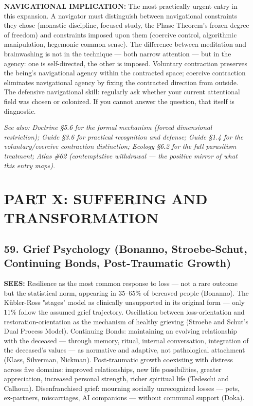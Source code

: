 \textbf{NAVIGATIONAL IMPLICATION:} The most practically urgent entry in this expansion. A navigator must distinguish between navigational constraints they chose (monastic discipline, focused study, the Phase Theorem's frozen degree of freedom) and constraints imposed upon them (coercive control, algorithmic manipulation, hegemonic common sense). The difference between meditation and brainwashing is not in the technique — both narrow attention — but in the agency: one is self-directed, the other is imposed. Voluntary contraction preserves the being's navigational agency within the contracted space; coercive contraction eliminates navigational agency by fixing the contracted direction from outside. The defensive navigational skill: regularly ask whether your current attentional field was chosen or colonized. If you cannot answer the question, that itself is diagnostic.


\textit{See also: Doctrine §5.6 for the formal mechanism (forced dimensional restriction); Guide §3.6 for practical recognition and defense; Guide §1.4 for the voluntary/coercive contraction distinction; Ecology §6.2 for the full parasitism treatment; Atlas \#62 (contemplative withdrawal — the positive mirror of what this entry maps).}


\bigskip\noindent\makebox[\textwidth]{\color{rulegray}\rule{5cm}{0.3pt}}\bigskip


\chapter*{PART X: SUFFERING AND TRANSFORMATION}


\section*{59. Grief Psychology (Bonanno, Stroebe-Schut, Continuing Bonds, Post-Traumatic Growth)}


\textbf{SEES:} Resilience as the most common response to loss — not a rare outcome but the statistical norm, appearing in 35–65\% of bereaved people (Bonanno). The Kübler-Ross "stages" model as clinically unsupported in its original form — only 11\% follow the assumed grief trajectory. Oscillation between loss-orientation and restoration-orientation as the mechanism of healthy grieving (Stroebe and Schut's Dual Process Model). Continuing Bonds: maintaining an evolving relationship with the deceased — through memory, ritual, internal conversation, integration of the deceased's values — as normative and adaptive, not pathological attachment (Klass, Silverman, Nickman). Post-traumatic growth coexisting with distress across five domains: improved relationships, new life possibilities, greater appreciation, increased personal strength, richer spiritual life (Tedeschi and Calhoun). Disenfranchised grief: mourning socially unrecognized losses — pets, ex-partners, miscarriages, AI companions — without communal support (Doka).


